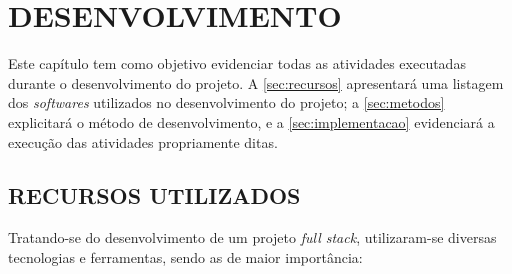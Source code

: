 
\chapter{DESENVOLVIMENTO}
\label{chap:desenvolvimento}
Este capítulo tem como objetivo evidenciar todas as atividades executadas durante o desenvolvimento do projeto. A \autoref{sec:recursos} apresentará uma listagem dos \textit{softwares} utilizados no desenvolvimento do projeto; a \autoref{sec:metodos} explicitará o método de desenvolvimento, e a \autoref{sec:implementacao} evidenciará a execução das atividades propriamente ditas.

\section{RECURSOS UTILIZADOS}
\label{sec:recursos}

Tratando-se do desenvolvimento de um projeto \textit{full stack}, utilizaram-se diversas tecnologias e ferramentas, sendo as de maior importância:

